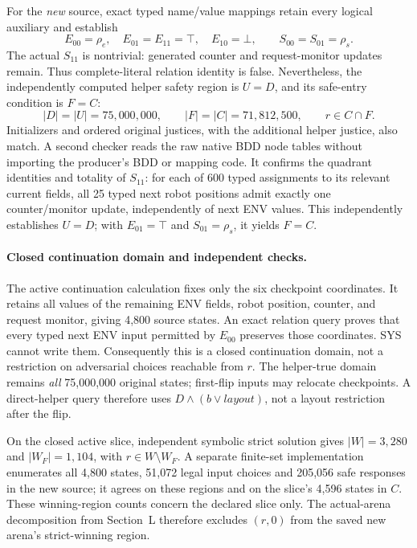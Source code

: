 For the \emph{new} source, exact typed name/value mappings retain every
logical auxiliary and establish
\[
 E_{00}=\rho_e,\quad E_{01}=E_{11}=\top,\quad E_{10}=\bot,
 \qquad S_{00}=S_{01}=\rho_s.
\]
The actual $S_{11}$ is nontrivial: generated counter and request-monitor
updates remain. Thus complete-literal relation identity is false.
Nevertheless, the independently computed helper safety region is
$U=D$, and its safe-entry condition is $F=C$:
\[
 |D|=|U|=75{,}000{,}000,\qquad |F|=|C|=71{,}812{,}500,
 \qquad r\in C\cap F.
\]
Initializers and ordered original justices, with the additional
helper justice, also match. A second checker reads the raw native BDD
node tables without importing the producer's BDD or mapping code. It
confirms the quadrant identities and totality of $S_{11}$: for each of
600 typed assignments to its relevant current fields, all 25 typed next
robot positions admit exactly one counter/monitor update, independently
of next ENV values. This independently establishes $U=D$; with
$E_{01}=\top$ and $S_{01}=\rho_s$, it yields $F=C$.

\paragraph{Closed continuation domain and independent checks.}
The active continuation calculation fixes only the six checkpoint
coordinates. It retains all values of the remaining ENV fields, robot
position, counter, and request monitor, giving 4,800 source states.
An exact relation query proves that every typed next ENV input permitted
by $E_{00}$ preserves those coordinates. SYS cannot write them.
Consequently this is a closed continuation domain, not a restriction on
adversarial choices reachable from $r$. The helper-true domain remains
\emph{all} 75,000,000 original states; first-flip inputs may relocate
checkpoints. A direct-helper query therefore uses
$D\land(b\lor\mathit{layout})$, not a layout restriction after the flip.

On the closed active slice, independent symbolic strict solution gives
$|W|=3{,}280$ and $|W_F|=1{,}104$, with $r\in W\setminus W_F$.
A separate finite-set implementation enumerates all 4,800 states,
51,072 legal input choices and 205,056 safe responses in the new source;
it agrees on these regions and on the slice's 4,596 states in $C$.
These winning-region counts concern the declared slice only.
The actual-arena decomposition from Section~L therefore excludes
$(r,0)$ from the saved new arena's strict-winning region.

